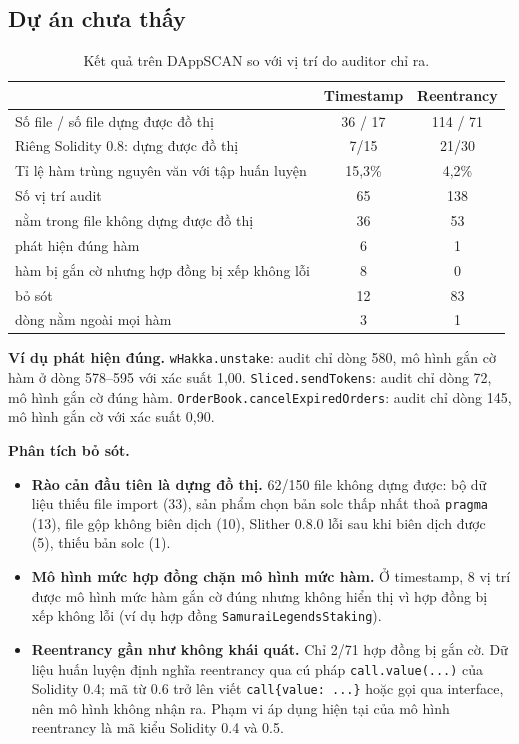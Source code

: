 \documentclass[12pt,a4paper]{article}
\newcommand{\code}[1]{\texttt{#1}}
\begin{document}
\subsection{Dự án chưa thấy}
\begin{table}[H]\centering\small
\caption{Kết quả trên DAppSCAN so với vị trí do auditor chỉ ra.}\label{tab:dapp}
\begin{tabular}{lcc}
\toprule
 & Timestamp & Reentrancy\\
\midrule
Số file / số file dựng được đồ thị & 36 / 17 & 114 / 71\\
Riêng Solidity 0.8: dựng được đồ thị & 7/15 & 21/30\\
Tỉ lệ hàm trùng nguyên văn với tập huấn luyện & 15{,}3\% & 4{,}2\%\\
Số vị trí audit & 65 & 138\\
\quad nằm trong file không dựng được đồ thị & 36 & 53\\
\quad phát hiện đúng hàm & 6 & 1\\
\quad hàm bị gắn cờ nhưng hợp đồng bị xếp không lỗi & 8 & 0\\
\quad bỏ sót & 12 & 83\\
\quad dòng nằm ngoài mọi hàm & 3 & 1\\
\bottomrule
\end{tabular}
\end{table}
\textbf{Ví dụ phát hiện đúng.} \code{wHakka.unstake}: audit chỉ dòng 580, mô hình gắn cờ hàm ở dòng 578--595 với xác suất 1{,}00. \code{Sliced.sendTokens}: audit chỉ dòng 72, mô hình gắn cờ đúng hàm. \code{OrderBook.cancelExpiredOrders}: audit chỉ dòng 145, mô hình gắn cờ với xác suất 0{,}90.

\textbf{Phân tích bỏ sót.}
\begin{itemize}
\item \textbf{Rào cản đầu tiên là dựng đồ thị.} 62/150 file không dựng được: bộ dữ liệu thiếu file import (33), sản phẩm chọn bản solc thấp nhất thoả \code{pragma} (13), file gộp không biên dịch (10), Slither 0.8.0 lỗi sau khi biên dịch được (5), thiếu bản solc (1).
\item \textbf{Mô hình mức hợp đồng chặn mô hình mức hàm.} Ở timestamp, 8 vị trí được mô hình mức hàm gắn cờ đúng nhưng không hiển thị vì hợp đồng bị xếp không lỗi (ví dụ hợp đồng \code{SamuraiLegendsStaking}).
\item \textbf{Reentrancy gần như không khái quát.} Chỉ 2/71 hợp đồng bị gắn cờ. Dữ liệu huấn luyện định nghĩa reentrancy qua cú pháp \code{call.value(...)} của Solidity 0.4; mã từ 0.6 trở lên viết \code{call\{value: ...\}} hoặc gọi qua interface, nên mô hình không nhận ra. Phạm vi áp dụng hiện tại của mô hình reentrancy là mã kiểu Solidity 0.4 và 0.5.
\end{itemize}
\end{document}
